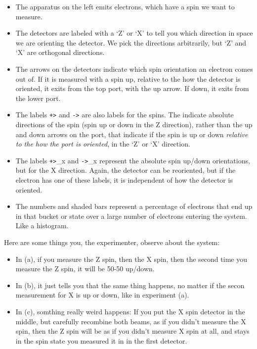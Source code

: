 \documentclass[
]{book}
\providecommand{\tightlist}{%
  \setlength{\itemsep}{0pt}\setlength{\parskip}{0pt}}
\begin{document}
\begin{itemize}
\tightlist
\item
  The apparatus on the left emits electrons, which have a spin we want to measure.
\item
  The detectors are labeled with a `Z' or `X' to tell you which direction in space we are orienting the detector. We pick the directions arbitrarily, but `Z' and `X' are orthogonal directions.
\item
  The arrows on the detectors indicate which spin orientation an electron comes out of. If it is measured with a spin up, relative to the how the detector is oriented, it exits from the top port, with the up arrow. If down, it exits from the lower port.
\item
  The labels \texttt{\textbar{}+\textgreater{}} and \texttt{\textbar{}-\textgreater{}} are also labels for the spins. The indicate absolute directions of the spin (spin up or down in the Z direction), rather than the up and down arrows on the port, that indicate if the spin is up or down \emph{relative to the how the port is oriented}, in the `Z' or `X' direction.
\item
  The labels \texttt{\textbar{}+\textgreater{}}\_x and \texttt{\textbar{}-\textgreater{}}\_x represent the absolute spin up/down orientations, but for the X direction. Again, the detector can be reoriented, but if the electron has one of these labels, it is independent of how the detector is oriented.
\item
  The numbers and shaded bars represent a percentage of electrons that end up in that bucket or state over a large number of electrons entering the system. Like a histogram.
\end{itemize}

Here are some things you, the experimenter, observe about the system:

\begin{itemize}
\tightlist
\item
  In (a), if you measure the Z spin, then the X spin, then the second time you measure the Z spin, it will be 50-50 up/down.
\item
  In (b), it just tells you that the same thing happens, no matter if the secon measurement for X is up or down, like in experiment (a).
\item
  In (c), somthing really weird happens: If you put the X spin detector in the middle, but carefully recombine both beams, as if you didn't measure the X spin, then the Z spin will be as if you didn't measure X spin at all, and stays in the spin state you measured it in in the first detector.
\end{itemize}
\end{document}
